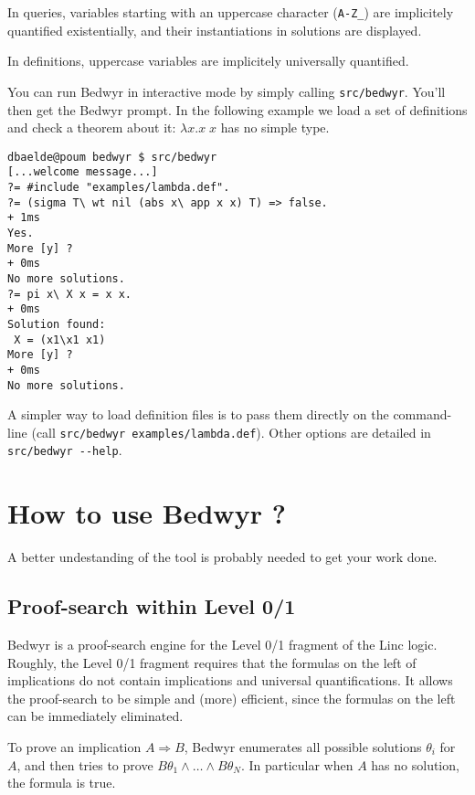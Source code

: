 \documentclass{article}
\begin{document}
In queries, variables starting with an uppercase character (\verb.A-Z_.)
are implicitely quantified existentially, and their instantiations in solutions
are displayed.

In definitions, uppercase variables are implicitely universally quantified.

You can run Bedwyr in interactive mode by simply calling \texttt{src/bedwyr}.
You'll then get the Bedwyr prompt. In the following example we load a set of 
definitions and check a theorem about it: $\lambda x.x\;x$ has no simple type.

\begin{verbatim}
dbaelde@poum bedwyr $ src/bedwyr
[...welcome message...]
?= #include "examples/lambda.def".
?= (sigma T\ wt nil (abs x\ app x x) T) => false.
+ 1ms
Yes.
More [y] ?
+ 0ms
No more solutions.
?= pi x\ X x = x x.
+ 0ms
Solution found:
 X = (x1\x1 x1)
More [y] ?
+ 0ms
No more solutions.
\end{verbatim}

A simpler way to load definition files is to pass them directly on the
command-line (call \verb|src/bedwyr examples/lambda.def|).
Other options are detailed in \verb.src/bedwyr --help..

\newpage
\section{How to use Bedwyr ?}
\label{sec:howto}

A better undestanding of the tool is probably needed to get your work done.

\subsection{Proof-search within Level 0/1}

Bedwyr is a proof-search engine for the Level 0/1 fragment of the Linc logic.
Roughly, the Level 0/1 fragment requires that the formulas on the left of
implications do not contain implications and universal quantifications.
It allows the proof-search to be simple and (more) efficient,
since the formulas on the left can be immediately eliminated.

To prove an implication $A\Rightarrow B$,
Bedwyr enumerates all possible solutions $\theta_i$ for $A$,
and then tries to prove $B\theta_1\wedge\dots\wedge B\theta_N$.
In particular when $A$ has no solution, the formula is true.
\end{document}

